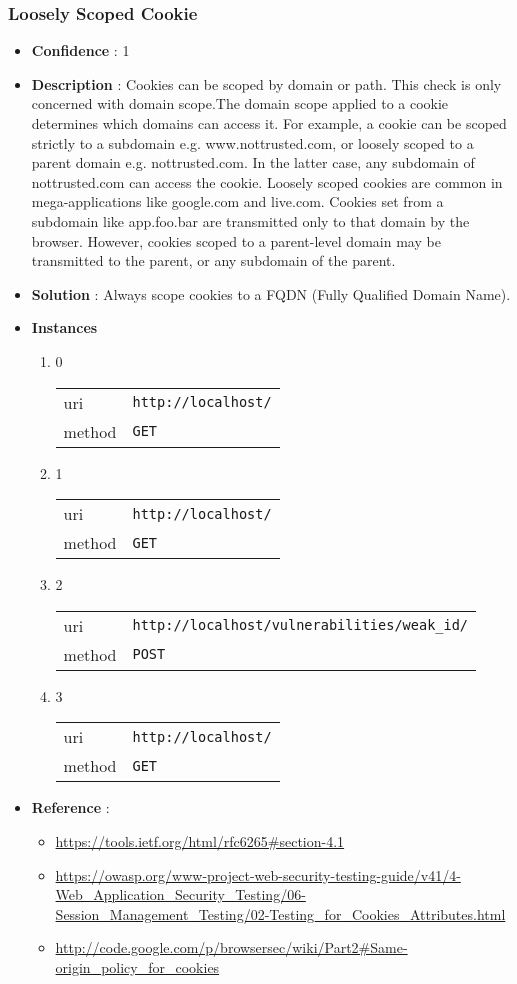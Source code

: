 \documentclass[10pt]{article}
\begin{document}
\subsubsection{Loosely Scoped Cookie}
\begin{itemize}
\item[] \textbf{Confidence} : 1
\item[] \textbf{Description} : Cookies can be scoped by domain or path. This check is only concerned with domain scope.The domain scope applied to a cookie determines which domains can access it. For example, a cookie can be scoped strictly to a subdomain e.g. www.nottrusted.com, or loosely scoped to a parent domain e.g. nottrusted.com. In the latter case, any subdomain of nottrusted.com can access the cookie. Loosely scoped cookies are common in mega-applications like google.com and live.com. Cookies set from a subdomain like app.foo.bar are transmitted only to that domain by the browser. However, cookies scoped to a parent-level domain may be transmitted to the parent, or any subdomain of the parent.
\item[] \textbf{Solution} :  Always scope cookies to a FQDN (Fully Qualified Domain Name).
\item[] \textbf{Instances}
\begin{enumerate}
\item[] 0
\begin{tabular}{| l | p{12cm}}
uri & \texttt{http://localhost/} \\
method & \texttt{GET} \\
\end{tabular}
\item[] 1
\begin{tabular}{| l | p{12cm}}
uri & \texttt{http://localhost/} \\
method & \texttt{GET} \\
\end{tabular}
\item[] 2
\begin{tabular}{| l | p{12cm}}
uri & \texttt{http://localhost/vulnerabilities/weak\_id/} \\
method & \texttt{POST} \\
\end{tabular}
\item[] 3
\begin{tabular}{| l | p{12cm}}
uri & \texttt{http://localhost/} \\
method & \texttt{GET} \\
\end{tabular}
\end{enumerate}
\item[] \textbf{Reference} : 
\begin{itemize}
\item \url{https://tools.ietf.org/html/rfc6265\#section-4.1}
\item \url{https://owasp.org/www-project-web-security-testing-guide/v41/4-Web\_Application\_Security\_Testing/06-Session\_Management\_Testing/02-Testing\_for\_Cookies\_Attributes.html}
\item \url{http://code.google.com/p/browsersec/wiki/Part2\#Same-origin\_policy\_for\_cookies}
\end{itemize}
\end{itemize}
\end{document}
